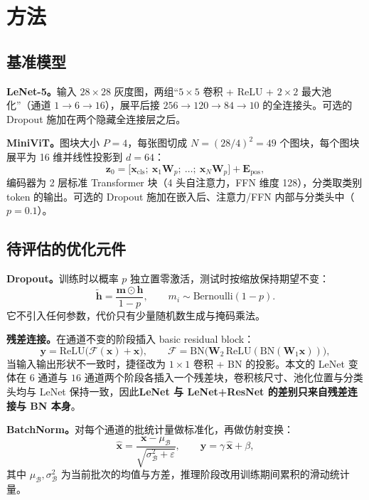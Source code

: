 \documentclass[12pt,hyperref,a4paper,UTF8]{ctexart}
\begin{document}
\section{方法}

\subsection{基准模型}
\textbf{LeNet-5。}输入 $28\times28$ 灰度图，两组“$5\times5$ 卷积 + ReLU + $2\times2$ 最大池化”（通道 $1\to6\to16$），展平后接 $256\to120\to84\to10$ 的全连接头。可选的 Dropout 施加在两个隐藏全连接层之后。

\textbf{MiniViT。}图块大小 $P=4$，每张图切成 $N=(28/4)^2=49$ 个图块，每个图块展平为 16 维并线性投影到 $d=64$：
\begin{equation}
    \bm{z}_0=\big[\bm{x}_{\mathrm{cls}};\ \bm{x}_1\bm{W}_p;\ \dots;\ \bm{x}_{N}\bm{W}_p\big]+\bm{E}_{\mathrm{pos}},
    \label{eq:embed}
\end{equation}
编码器为 2 层标准 Transformer 块（4 头自注意力，FFN 维度 128），分类取类别 token 的输出。可选的 Dropout 施加在嵌入后、注意力/FFN 内部与分类头中（$p=0.1$）。

\subsection{待评估的优化元件}
\textbf{Dropout。}训练时以概率 $p$ 独立置零激活，测试时按缩放保持期望不变：
\begin{equation}
    \tilde{\bm{h}}=\frac{\bm{m}\odot\bm{h}}{1-p},\qquad m_i\sim\mathrm{Bernoulli}(1-p).
    \label{eq:dropout}
\end{equation}
它不引入任何参数，代价只有少量随机数生成与掩码乘法。

\textbf{残差连接。}在通道不变的阶段插入 basic residual block：
\begin{equation}
    \bm{y}=\mathrm{ReLU}\big(\mathcal{F}(\bm{x})+\bm{x}\big),\qquad
    \mathcal{F}=\mathrm{BN}\big(\bm{W}_2\,\mathrm{ReLU}(\mathrm{BN}(\bm{W}_1\bm{x}))\big),
    \label{eq:res}
\end{equation}
当输入输出形状不一致时，捷径改为 $1\times1$ 卷积 + BN 的投影。本文的 LeNet 变体在 $6$ 通道与 $16$ 通道两个阶段各插入一个残差块，卷积核尺寸、池化位置与分类头均与 LeNet 保持一致，因此\textbf{LeNet 与 LeNet+ResNet 的差别只来自残差连接与 BN 本身}。

\textbf{BatchNorm。}对每个通道的批统计量做标准化，再做仿射变换：
\begin{equation}
    \widehat{\bm{x}}=\frac{\bm{x}-\mu_{\mathcal{B}}}{\sqrt{\sigma_{\mathcal{B}}^2+\varepsilon}},\qquad \bm{y}=\gamma\,\widehat{\bm{x}}+\beta,
    \label{eq:bn}
\end{equation}
其中 $\mu_{\mathcal{B}},\sigma_{\mathcal{B}}^2$ 为当前批次的均值与方差，推理阶段改用训练期间累积的滑动统计量。
\end{document}
